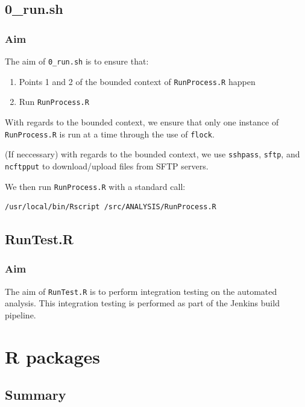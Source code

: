\documentclass[12pt,]{article}
\providecommand{\tightlist}{%
  \setlength{\itemsep}{0pt}\setlength{\parskip}{0pt}}
\theoremstyle{definition}
\theoremstyle{definition}
\theoremstyle{definition}
\theoremstyle{remark}
\begin{document}
\subsection{0\_run.sh}\label{run.sh}

\subsubsection{Aim}\label{aim-1}

The aim of \texttt{0\_run.sh} is to ensure that:

\begin{enumerate}
\def\labelenumi{\arabic{enumi}.}
\tightlist
\item
  Points 1 and 2 of the bounded context of \texttt{RunProcess.R} happen
\item
  Run \texttt{RunProcess.R}
\end{enumerate}

With regards to the bounded context, we ensure that only one instance of
\texttt{RunProcess.R} is run at a time through the use of
\texttt{flock}.

(If neccessary) with regards to the bounded context, we use
\texttt{sshpass}, \texttt{sftp}, and \texttt{ncftpput} to
download/upload files from SFTP servers.

We then run \texttt{RunProcess.R} with a standard call:

\begin{verbatim}
/usr/local/bin/Rscript /src/ANALYSIS/RunProcess.R
\end{verbatim}

\subsection{RunTest.R}\label{runtest.r}

\subsubsection{Aim}\label{aim-2}

The aim of \texttt{RunTest.R} is to perform integration testing on the
automated analysis. This integration testing is performed as part of the
Jenkins build pipeline.

\section{R packages}\label{r-packages}

\subsection{Summary}\label{summary-1}
\end{document}
